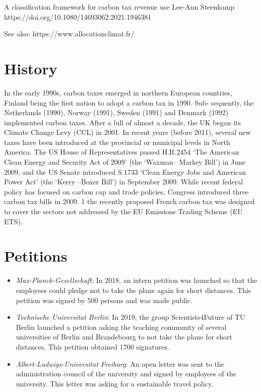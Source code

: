 \documentclass[version=3.21, pagesize, twoside=off, bibliography=totoc, DIV=calc, fontsize=12pt, a4paper, french, english]{scrartcl}
\begin{document}
A classification framework for carbon tax revenue use
Lee-Ann Steenkamp
https://doi.org/10.1080/14693062.2021.1946381 

See also: https://www.allocationclimat.fr/

\section{History}
In the early 1990s, carbon taxes emerged
in northern European countries, Finland being the first nation to adopt a carbon tax in 1990. Sub-
sequently, the Netherlands (1990), Norway (1991), Sweden (1991) and Denmark (1992) implemented
carbon taxes. After a lull of almost a decade, the UK began its Climate Change Levy (CCL) in 2001. In
recent years (before 2011), several new taxes have been introduced at the provincial or municipal levels in North
America.
The US House of Representatives
passed H.R.2454 ‘The American Clean Energy and Security Act of 2009’ (the ‘Waxman– Markey Bill’) in
June 2009, and the US Senate introduced S.1733 ‘Clean Energy Jobs and American Power Act’ (the
‘Kerry –Boxer Bill’) in September 2009. While recent federal policy has focused on carbon cap and
trade policies, Congress introduced three carbon tax bills in 2009. 1
the recently proposed French carbon tax was
designed to cover the sectors not addressed by the EU Emissions Trading Scheme (EU ETS).

\section{Petitions} 
\begin{itemize}
\item \emph{Max-Planck-Gesellschaft}: In 2018, an intern petition was launched so that the employees could pledge not to take the plane again for short distances. This petition was signed by 500 persons and was made public. 
\item \emph{Technische Universitat Berlin}: In 2019, the group Scientists4Future of TU Berlin launched a petition asking the teaching community of several universities of Berlin and Brandebourg to not take the plane for short distances. This petition obtained 1700 signatures.
\item \emph{Albert-Ludwigs-Universitat Freiburg}: An open letter was sent to the administration council of the university and signed by employees of the university. This letter was asking for a sustainable travel policy. 
\end{itemize}
\end{document}
